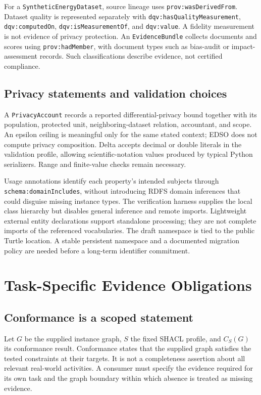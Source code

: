 \documentclass[conference]{IEEEtran}
\newcommand{\term}[1]{\texttt{#1}}
\begin{document}
For a \term{SyntheticEnergyDataset}, source lineage uses \term{prov:wasDerivedFrom}. Dataset quality is represented separately with \term{dqv:hasQualityMeasurement}, \term{dqv:computedOn}, \term{dqv:isMeasurementOf}, and \term{dqv:value}. A fidelity measurement is not evidence of privacy protection. An \term{EvidenceBundle} collects documents and scores using \term{prov:hadMember}, with document types such as bias-audit or impact-assessment records. Such classifications describe evidence, not certified compliance.

\subsection{Privacy statements and validation choices}
A \term{PrivacyAccount} records a reported differential-privacy bound together with its population, protected unit, neighboring-dataset relation, accountant, and scope. An epsilon ceiling is meaningful only for the same stated context; EDSO does not compute privacy composition. Delta accepts decimal or double literals in the validation profile, allowing scientific-notation values produced by typical Python serializers. Range and finite-value checks remain necessary.

Usage annotations identify each property's intended subjects through \term{schema:domainIncludes}, without introducing RDFS domain inferences that could disguise missing instance types. The verification harness supplies the local class hierarchy but disables general inference and remote imports. Lightweight external entity declarations support standalone processing; they are not complete imports of the referenced vocabularies. The draft namespace is tied to the public Turtle location. A stable persistent namespace and a documented migration policy are needed before a long-term identifier commitment.

\section{Task-Specific Evidence Obligations}
\subsection{Conformance is a scoped statement}
Let $G$ be the supplied instance graph, $S$ the fixed SHACL profile, and $C_S(G)$ its conformance result. Conformance states that the supplied graph satisfies the tested constraints at their targets. It is not a completeness assertion about all relevant real-world activities. A consumer must specify the evidence required for its own task and the graph boundary within which absence is treated as missing evidence.
\end{document}
